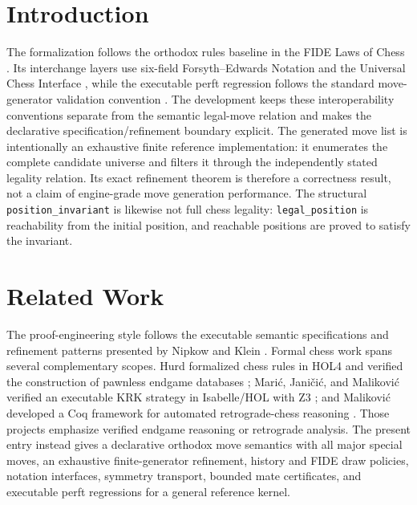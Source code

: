 \documentclass[11pt,a4paper]{article}
\begin{document}
\section*{Introduction}
The formalization follows the orthodox rules baseline in the FIDE Laws of
Chess \cite{FIDE2023Laws}.  Its interchange layers use six-field Forsyth--Edwards
Notation and the Universal Chess Interface \cite{ForsythEdwards,UCIProtocol},
while the executable perft regression follows the standard move-generator
validation convention \cite{ChessProgrammingPerft}.  The development keeps
these interoperability conventions separate from the semantic legal-move
relation and makes the declarative specification/refinement boundary explicit.
The generated move list is intentionally an exhaustive finite reference
implementation: it enumerates the complete candidate universe and filters it
through the independently stated legality relation.  Its exact refinement
theorem is therefore a correctness result, not a claim of engine-grade move
generation performance.  The structural \texttt{position\_invariant} is likewise not
full chess legality: \texttt{legal\_position} is reachability from the initial
position, and reachable positions are proved to satisfy the invariant.

\section*{Related Work}
The proof-engineering style follows the executable semantic specifications and
refinement patterns presented by Nipkow and Klein \cite{NipkowKlein2014}.
Formal chess work spans several complementary scopes.  Hurd formalized chess
rules in HOL4 and verified the construction of pawnless endgame databases
\cite{Hurd2005ChessEndgames}; Mari\'c, Jani\v{c}i\'c, and Malikovi\'c verified an
executable KRK strategy in Isabelle/HOL with Z3 \cite{MaricJanicicMalikovic2015};
and Malikovi\'c developed a Coq framework for automated retrograde-chess
reasoning \cite{Malikovic2008Retrograde}.  Those projects emphasize verified
endgame reasoning or retrograde analysis.  The present entry instead gives a
declarative orthodox move semantics with all major special moves, an
exhaustive finite-generator refinement, history and FIDE draw policies,
notation interfaces, symmetry transport, bounded mate certificates, and
executable perft regressions for a general reference kernel.

\tableofcontents




\end{document}
